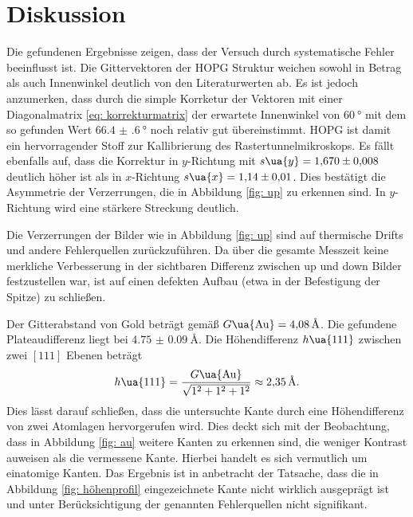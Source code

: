 \section{Diskussion}
Die gefundenen Ergebnisse zeigen, dass der Versuch durch systematische Fehler beeinflusst ist.
Die Gittervektoren der HOPG Struktur weichen sowohl in Betrag als auch Innenwinkel
deutlich von den Literaturwerten ab. Es ist jedoch anzumerken, dass durch die simple Korrketur der Vektoren
mit einer Diagonalmatrix \eqref{eq: korrekturmatrix} der erwartete Innenwinkel von $\SI{60}{\degree}$ mit dem so
gefunden Wert $\SI{66.4(6)}{\degree}$ noch relativ gut übereinstimmt. HOPG ist damit ein hervorragender Stoff
zur Kallibrierung des Rastertunnelmikroskops. Es fällt ebenfalls auf, dass die Korrektur in $y$-Richtung mit
$s\ua{y} = \num{1.670(8)}$ deutlich höher ist als in $x$-Richtung $s\ua{x} = \num{1.14(1)}$. Dies bestätigt
die Asymmetrie der Verzerrungen, die in Abbildung \ref{fig: up} zu erkennen sind. In $y$-Richtung
wird eine stärkere Streckung deutlich.

Die Verzerrungen der Bilder wie in Abbildung \ref{fig: up} sind auf thermische Drifts und andere Fehlerquellen
zurückzuführen. Da über die gesamte Messzeit keine merkliche Verbesserung in der sichtbaren Differenz zwischen
up und down Bilder festzustellen war, ist auf einen defekten Aufbau (etwa in der Befestigung der Spitze) zu schließen.

Der Gitterabstand von Gold beträgt gemäß \cite{gitterkonstanten} $G\ua{\ce{Au}} = \SI{4.08}{\angstrom}$. Die gefundene Plateaudifferenz
liegt bei $\SI{4.75(9)}{\angstrom}$. Die Höhendifferenz $h\ua{111}$ zwischen zwei $[111]$ Ebenen beträgt
\begin{equation}
  h\ua{111} = \frac{G\ua{\ce{Au}}}{\sqrt{1^2 + 1^2 + 1^2}} \approx \SI{2.35}{\angstrom}.
\end{equation}
Dies lässt darauf schließen, dass die untersuchte Kante durch eine Höhendifferenz von zwei Atomlagen
hervorgerufen wird. Dies deckt sich mit der Beobachtung, dass in Abbildung \ref{fig: au} weitere Kanten zu erkennen
sind, die weniger Kontrast auweisen als die vermessene Kante. Hierbei handelt es sich vermutlich um
einatomige Kanten.
Das Ergebnis ist in anbetracht der Tatsache,
dass die in Abbildung \ref{fig: höhenprofil} eingezeichnete Kante nicht wirklich ausgeprägt ist
und unter Berücksichtigung der genannten Fehlerquellen nicht signifikant.
